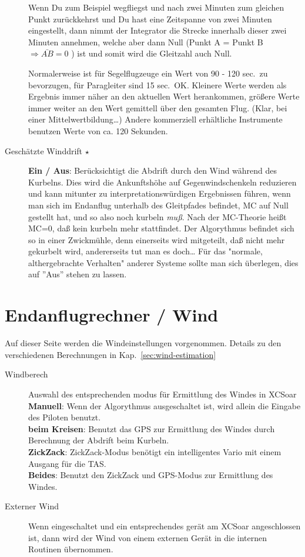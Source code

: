 \begin{description}
Wenn Du zum Beispiel wegfliegst und nach zwei Minuten zum gleichen Punkt zurückkehrst und Du hast eine Zeitspanne von zwei Minuten eingestellt,
dann nimmt der Integrator die Strecke innerhalb dieser zwei Minuten annehmen, welche aber dann Null (Punkt A = Punkt B $\Rightarrow \bar{AB} = 0$ )
ist und somit wird die Gleitzahl auch Null.

Normalerweise ist für Segelflugzeuge ein Wert von 90 - 120 sec.\ zu bevorzugen,
für Paragleiter sind 15 sec.\ OK. Kleinere Werte werden als Ergebnis immer näher an den
aktuellen Wert herankommen, größere Werte immer weiter an den Wert gemittell über den gesamten Flug.
(Klar, bei einer Mittelwertbildung\dots) Andere kommerziell erhältliche Instrumente benutzen Werte von ca. 120 Sekunden.
\item[Geschätzte Winddrift $\star$]  {\bf Ein / Aus}: Berücksichtigt die Abdrift durch den Wind während des Kurbelns. Dies wird die Ankunftshöhe auf Gegenwindschenkeln reduzieren
und kann mitunter zu interpretationswürdigen Ergebnissen führen,
wenn man sich im Endanflug unterhalb des Gleitpfades befindet, MC auf Null gestellt hat, und so also noch kurbeln \textsl{muß}.
Nach der MC-Theorie heißt MC=0, daß kein kurbeln mehr stattfindet. Der Algorythmus befindet sich so in einer Zwickmühle, denn einerseits wird mitgeteilt, daß nicht
mehr gekurbelt wird, andererseits tut man es doch\dots
\achtung Für das "normale, althergebrachte Verhalten" anderer Systeme sollte man sich überlegen, dies auf ''Aus'' stehen zu lassen.
\end{description}

\section{Endanflugrechner / Wind} \label{sec:final-wind}
Auf dieser Seite werden die Windeinstellungen vorgenommen. Details zu den verschiedenen Berechnungen in Kap.~\ref{sec:wind-estimation}
\begin{description}
\item[Windberech]  \label{conf:autowind}  Auswahl des entsprechenden modus für Ermittlung des Windes in \textsf{XCSoar} \\
  {\bf Manuell}: Wenn der Algorythmus ausgeschaltet ist, wird allein die Eingabe des Piloten benutzt. \\
  {\bf beim Kreisen}: Benutzt das GPS zur Ermittlung des Windes durch Berechnung der Abdrift beim Kurbeln.\\
  {\bf ZickZack}: ZickZack-Modus benötigt ein intelligentes Vario  mit einem Ausgang für die TAS.\\
  {\bf Beides}:  Benutzt den ZickZack und GPS-Modus zur Ermittlung des Windes.
\item[Externer Wind]  Wenn eingeschaltet und ein entsprechendes gerät am \textsf{XCSoar} angeschlossen ist, dann wird der Wind von einem
externen Gerät in die internen Routinen übernommen.
\end{description}


